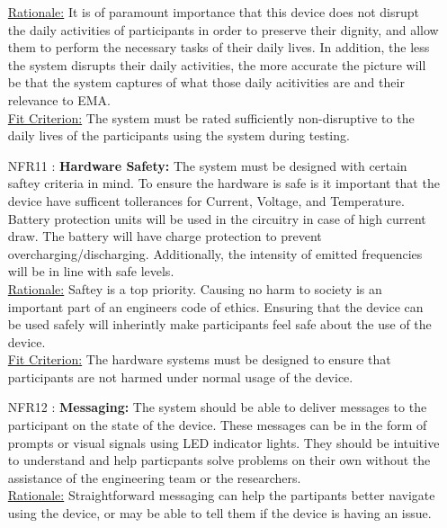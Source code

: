 \documentclass[12pt]{article}
\begin{document}
\begin{itemize}
\underline{Rationale:} It is of paramount importance that this device does not disrupt the daily activities of participants in order to preserve their dignity, and allow them to perform the necessary tasks of their daily lives. In addition, the less the system disrupts their daily activities, the more accurate the picture will be that the system captures of what those daily acitivities are and their relevance to EMA.\\

\underline{Fit Criterion:} The system must be rated sufficiently non-disruptive to the daily lives of the participants using the system during testing.\\

\item[NFR11 \label{NFR11}:]
  \textbf{Hardware Safety:} The system must be designed with certain saftey criteria in mind. To ensure the hardware is safe is it important that the device have sufficent tollerances for Current, Voltage, and Temperature. Battery protection units will be used in the circuitry in case of high current draw. The battery will have charge protection to prevent overcharging/discharging. Additionally, the intensity of emitted frequencies will be in line with safe levels.\\

\underline{Rationale:} Saftey is a top priority. Causing no harm to society is an important part of an engineers code of ethics. Ensuring that the device can be used safely will inherintly make participants feel safe about the use of the device.\\

\underline{Fit Criterion:} The hardware systems must be designed to ensure that participants are not harmed under normal usage of the device.\\

\item[NFR12 \label{NFR12}:]
  \textbf{Messaging:} The system should be able to deliver messages to the participant on the state of the device. These messages can be in the form of prompts or visual signals using LED indicator lights. They should be intuitive to understand and help particpants solve problems on their own without the assistance of the engineering team or the researchers.\\

\underline{Rationale:} Straightforward messaging can help the partipants better navigate using the device, or may be able to tell them if the device is having an issue.\\


\end{itemize}
\end{document}
